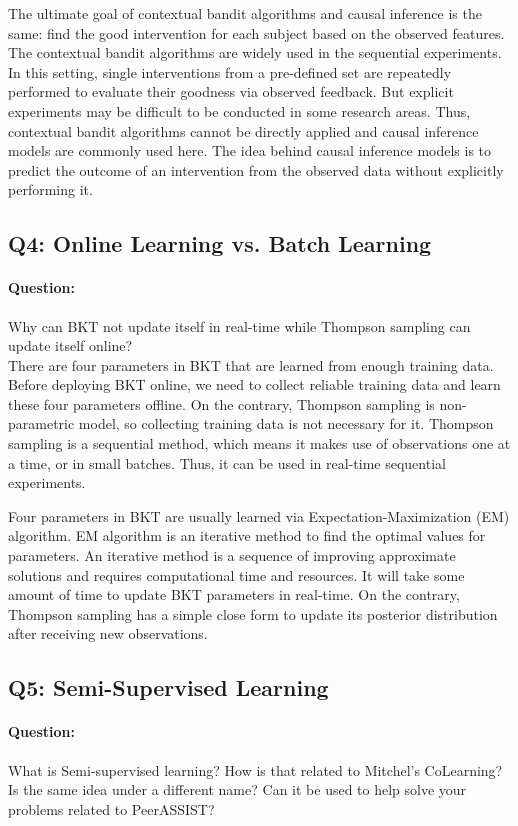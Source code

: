 \documentclass{article}
\begin{document}
The ultimate goal of contextual bandit algorithms and causal inference
is the same: find the good intervention for each subject based on the
observed features. The contextual bandit algorithms are widely used in
the sequential experiments. In this setting, single interventions from
a pre-defined set are repeatedly performed to evaluate their goodness
via observed feedback. But explicit experiments may be difficult to be
conducted in some research areas. Thus, contextual bandit algorithms
cannot be directly applied and causal inference models are commonly
used here. The idea behind causal inference models is to predict the
outcome of an intervention from the observed data without explicitly
performing it.

\subsection{Q4: Online Learning vs. Batch Learning}
\paragraph{Question:} Why can BKT not update itself in real-time while
Thompson sampling can update itself online? \\ [0.1in]

There are four parameters in BKT that are learned from enough training
data. Before deploying BKT online, we need to collect reliable
training data and learn these four parameters offline. On the
contrary, Thompson sampling is non-parametric model, so collecting
training data is not necessary for it. Thompson sampling is a sequential
method, which means it makes use of observations one at a time, or in
small batches. Thus, it can be used in real-time sequential experiments.

Four parameters in BKT are usually learned via
Expectation-Maximization (EM) algorithm. EM algorithm is an iterative
method to find the optimal values for parameters. An iterative method
is a sequence of improving approximate solutions and requires
computational time and resources. It will take some amount of time to
update BKT parameters in real-time. On the contrary, Thompson sampling
has a simple close form to update its posterior distribution after
receiving new observations.

\subsection{Q5: Semi-Supervised Learning}
\paragraph{Question:} What is Semi-supervised learning?  How is that
related to Mitchel's CoLearning? Is the same idea under a different
name?  Can it be used to help solve your problems related to
PeerASSIST?  \\ [0.1 in]
\end{document}
